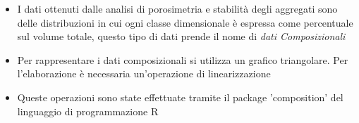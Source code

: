 \documentclass[10pt]{beamer}
\begin{document}
\begin{frame}

  \begin{columns}
    \vspace{1cm}
    \footnotesize
    \begin{itemize}[<+->]
    \item I dati ottenuti dalle analisi di porosimetria e
      stabilità degli aggregati sono delle distribuzioni in cui ogni
      classe dimensionale è espressa come percentuale sul volume totale,
      questo tipo di dati prende il nome di \emph{dati Composizionali}
      \pause
    \item Per rappresentare i dati composizionali si utilizza un
      grafico triangolare. Per l'elaborazione è necessaria
      un'operazione di linearizzazione
    \item Queste operazioni sono state effettuate tramite il package 'composition' del
      linguaggio di programmazione R
    \end{itemize}

  \end{columns}
\end{frame}
\end{document}
